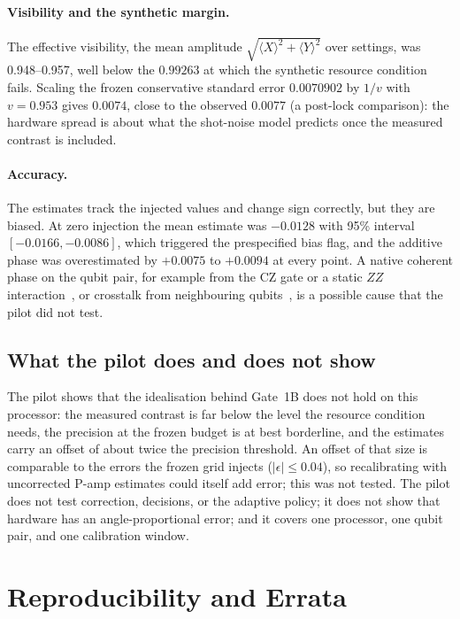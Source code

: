 \documentclass[10pt,twocolumn]{article}
\theoremstyle{definition}
\theoremstyle{remark}
\newcommand{\eps}{\epsilon}
\begin{document}
\paragraph{Visibility and the synthetic margin.} The effective visibility, the mean amplitude $\sqrt{\langle X\rangle^2+\langle Y\rangle^2}$ over settings, was 0.948--0.957, well below the $0.99263$ at which the synthetic resource condition fails. Scaling the frozen conservative standard error $0.0070902$ by $1/v$ with $v=0.953$ gives $0.0074$, close to the observed $0.0077$ (a post-lock comparison): the hardware spread is about what the shot-noise model predicts once the measured contrast is included.

\paragraph{Accuracy.} The estimates track the injected values and change sign correctly, but they are biased. At zero injection the mean estimate was $-0.0128$ with 95\% interval $[-0.0166,-0.0086]$, which triggered the prespecified bias flag, and the additive phase was overestimated by $+0.0075$ to $+0.0094$ at every point. A native coherent phase on the qubit pair, for example from the CZ gate or a static $ZZ$ interaction~\cite{krantz2019}, or crosstalk from neighbouring qubits~\cite{sarovar2020}, is a possible cause that the pilot did not test.

\subsection{What the pilot does and does not show}
The pilot shows that the idealisation behind Gate~1B does not hold on this processor: the measured contrast is far below the level the resource condition needs, the precision at the frozen budget is at best borderline, and the estimates carry an offset of about twice the precision threshold. An offset of that size is comparable to the errors the frozen grid injects ($|\eps|\le0.04$), so recalibrating with uncorrected P-amp estimates could itself add error; this was not tested. The pilot does not test correction, decisions, or the adaptive policy; it does not show that hardware has an angle-proportional error; and it covers one processor, one qubit pair, and one calibration window.

\section{Reproducibility and Errata}\label{sec:repro}
\end{document}
